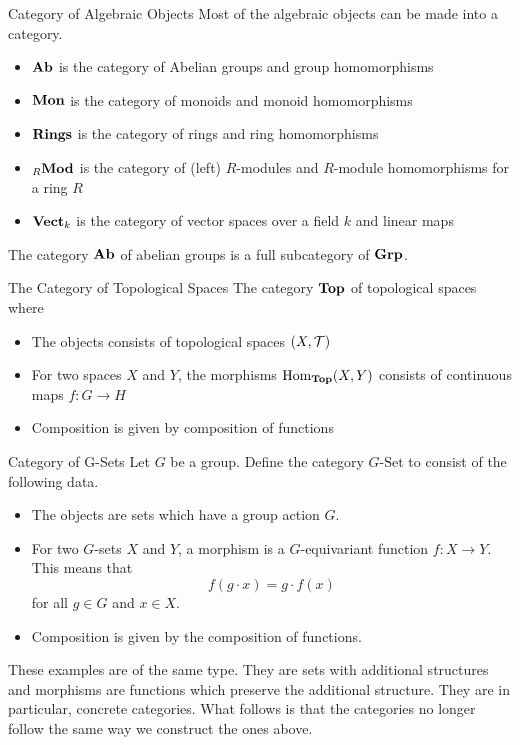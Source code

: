 \documentclass[a4paper]{article}
\begin{document}
\begin{defn}{Category of Algebraic Objects}{} Most of the algebraic objects can be made into a category. 
\begin{itemize}
\item $\bold{Ab}$ is the category of Abelian groups and group homomorphisms
\item $\bold{Mon}$ is the category of monoids and monoid homomorphisms
\item $\bold{Rings}$ is the category of rings and ring homomorphisms
\item ${_R}\bold{Mod}$ is the category of (left) $R$-modules and $R$-module homomorphisms for a ring $R$
\item $\bold{Vect}_k$ is the category of vector spaces over a field $k$ and linear maps
\end{itemize}
\end{defn}

The category $\bold{Ab}$ of abelian groups is a full subcategory of $\bold{Grp}$. 

\begin{defn}{The Category of Topological Spaces}{} The category $\bold{Top}$ of topological spaces where 
\begin{itemize}
\item The objects consists of topological spaces $(X,\mathcal{T})$
\item For two spaces $X$ and $Y$, the morphisms $\operatorname{Hom}_\bold{Top}(X,Y)$ consists of continuous maps $f:G\to H$
\item Composition is given by composition of functions
\end{itemize}
\end{defn}

\begin{defn}{Category of G-Sets}{} Let $G$ be a group. Define the category $G\text{-Set}$ to consist of the following data. 
\begin{itemize}
\item The objects are sets which have a group action $G$. 
\item For two $G$-sets $X$ and $Y$, a morphism is a $G$-equivariant function $f:X\to Y$. This means that $$f(g\cdot x)=g\cdot f(x)$$ for all $g\in G$ and $x\in X$. 
\item Composition is given by the composition of functions. 
\end{itemize}
\end{defn}

These examples are of the same type. They are sets with additional structures and morphisms are functions which preserve the additional structure. They are in particular, concrete categories. What follows is that the categories no longer follow the same way we construct the ones above. 
\end{document}
